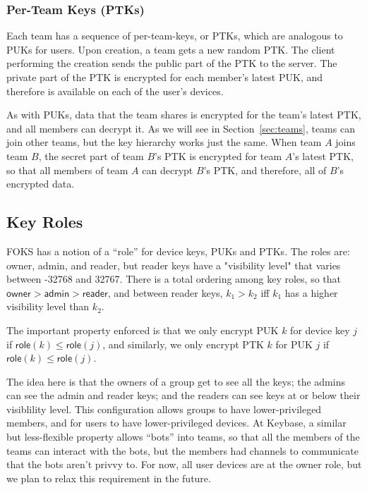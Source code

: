 \subsubsection{Per-Team Keys (PTKs)}

Each team has a sequence of per-team-keys, or PTKs, which are analogous
to PUKs for users. Upon creation, a team gets a new random PTK. The 
client performing the creation sends the public part of the PTK to the server.
The private part of the PTK is encrypted for each member's latest PUK,
and therefore is available on each of the user's devices.

As with PUKs, data that the team shares is encrypted for the team's latest PTK,
and all members can decrypt it. As we will see in Section~\ref{sec:teams}, teams can
join other teams, but the key hierarchy works just the same. When team $A$ joins
team $B$, the secret part of team $B$'s PTK is encrypted for team $A$'s latest PTK,
so that all members of team $A$ can decrypt $B$'s PTK, and therefore, all of
$B$'s encrypted data.

\subsection{Key Roles}

\newcommand{\owner}{\textsf{owner}}
\newcommand{\admin}{\textsf{admin}}
\newcommand{\reader}{\textsf{reader}}
\newcommand{\none}{\textsf{none}}
\newcommand{\role}[1]{\textsf{role}(#1)}


FOKS has a notion of a ``role'' for device keys, PUKs and PTKs. The roles
are: \owner, \admin, and \reader, but \reader{} keys have a "visibility level"
that varies between -32768 and 32767. There is a total ordering among key roles,
so that $\owner > \admin > \reader$, and between reader keys, $k_1 > k_2$ iff
$k_1$ has a higher visibility level than $k_2$.

The important property enforced is that we only encrypt PUK $k$ for device key
$j$ if $\role{k} \le \role{j}$, and similarly, we only encrypt PTK $k$ for PUK
$j$ if $\role{k} \le \role{j}$.

The idea here is that the owners of a group get to see all the keys; the admins
can see the admin and reader keys; and the readers can see keys at or below
their visiblility level. This configuration allows groups to have
lower-privileged members, and for users to have lower-privileged devices. At
Keybase, a similar but less-flexible property allows ``bots'' into teams, so that
all the members of the teams can interact with the bots, but the members had
channels to communicate that the bots aren't privvy to.  For now, all user
devices are at the \owner{} role, but we plan to relax this requirement in the
future.

